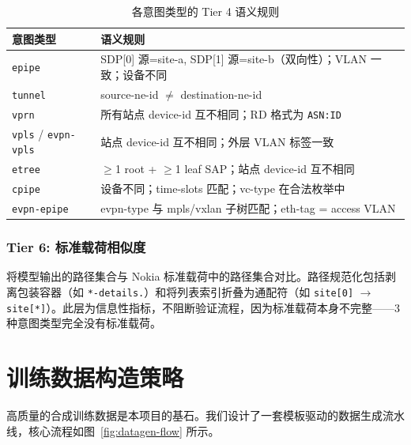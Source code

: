 \documentclass[12pt, a4paper]{article}
\newcommand{\intenttype}[1]{\texttt{#1}}
\begin{document}
\begin{table}[H]
\centering
\caption{各意图类型的 Tier 4 语义规则}
\label{tab:semantic-rules}
\small
\begin{tabular}{lp{9cm}}
\toprule
\textbf{意图类型} & \textbf{语义规则} \\
\midrule
\intenttype{epipe} &
  SDP[0] 源=site-a, SDP[1] 源=site-b（双向性）；VLAN 一致；设备不同 \\
\intenttype{tunnel} &
  source-ne-id $\neq$ destination-ne-id \\
\intenttype{vprn} &
  所有站点 device-id 互不相同；RD 格式为 \texttt{ASN:ID} \\
\intenttype{vpls} / \intenttype{evpn-vpls} &
  站点 device-id 互不相同；外层 VLAN 标签一致 \\
\intenttype{etree} &
  $\geq$1 root + $\geq$1 leaf SAP；站点 device-id 互不相同 \\
\intenttype{cpipe} &
  设备不同；time-slots 匹配；vc-type 在合法枚举中 \\
\intenttype{evpn-epipe} &
  evpn-type 与 mpls/vxlan 子树匹配；eth-tag = access VLAN \\
\bottomrule
\end{tabular}
\end{table}

\subsubsection{Tier 6: 标准载荷相似度}
\label{sec:tier6}

将模型输出的路径集合与 Nokia 标准载荷中的路径集合对比。路径规范化包括剥离包装容器（如 \texttt{*-details.}）和将列表索引折叠为通配符（如 \texttt{site[0]} $\to$ \texttt{site[*]}）。此层为信息性指标，不阻断验证流程，因为标准载荷本身不完整——3 种意图类型完全没有标准载荷。

\section{训练数据构造策略}
\label{sec:data-generation}

高质量的合成训练数据是本项目的基石。我们设计了一套模板驱动的数据生成流水线，核心流程如图~\ref{fig:datagen-flow} 所示。
\end{document}
